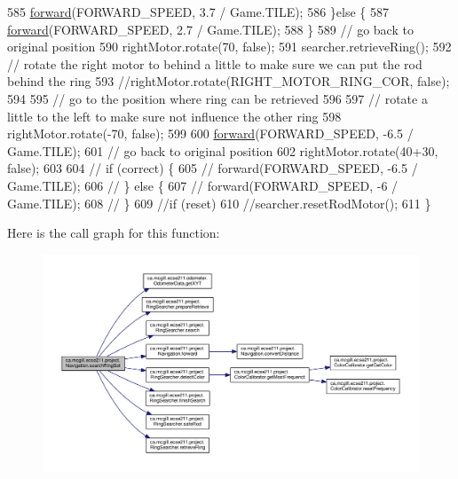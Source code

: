 \begin{DoxyCode}
585       \hyperlink{classca_1_1mcgill_1_1ecse211_1_1project_1_1_navigation_a7c66610c5b7496ddb35d342ab2cd3f08}{forward}(FORWARD\_SPEED, 3.7 / Game.TILE);
586     \}\textcolor{keywordflow}{else} \{
587       \hyperlink{classca_1_1mcgill_1_1ecse211_1_1project_1_1_navigation_a7c66610c5b7496ddb35d342ab2cd3f08}{forward}(FORWARD\_SPEED, 2.7 / Game.TILE);
588     \}
589     \textcolor{comment}{// go back to original position}
590     rightMotor.rotate(70, \textcolor{keyword}{false});
591     searcher.retrieveRing();
592     \textcolor{comment}{// rotate the right motor to behind a little to make sure we can put the rod behind the ring}
593     \textcolor{comment}{//rightMotor.rotate(RIGHT\_MOTOR\_RING\_COR, false);}
594 
595     \textcolor{comment}{// go to the position where ring can be retrieved}
596 
597     \textcolor{comment}{// rotate a little to the left to make sure not influence the other ring}
598     rightMotor.rotate(-70, \textcolor{keyword}{false});
599 
600     \hyperlink{classca_1_1mcgill_1_1ecse211_1_1project_1_1_navigation_a7c66610c5b7496ddb35d342ab2cd3f08}{forward}(FORWARD\_SPEED, -6.5 / Game.TILE);
601     \textcolor{comment}{// go back to original position}
602     rightMotor.rotate(40+30, \textcolor{keyword}{false});
603 
604 \textcolor{comment}{//    if (correct) \{}
605 \textcolor{comment}{//      forward(FORWARD\_SPEED, -6.5 / Game.TILE);}
606 \textcolor{comment}{//    \} else \{}
607 \textcolor{comment}{//      forward(FORWARD\_SPEED, -6 / Game.TILE);}
608 \textcolor{comment}{//    \}}
609     \textcolor{comment}{//if (reset)}
610       \textcolor{comment}{//searcher.resetRodMotor();}
611   \}
\end{DoxyCode}
Here is the call graph for this function\+:
\nopagebreak
\begin{figure}[H]
\begin{center}
\leavevmode
\includegraphics[width=350pt]{classca_1_1mcgill_1_1ecse211_1_1project_1_1_navigation_a1a808e665b8dd5b8e79b0580724d239c_cgraph}
\end{center}
\end{figure}
